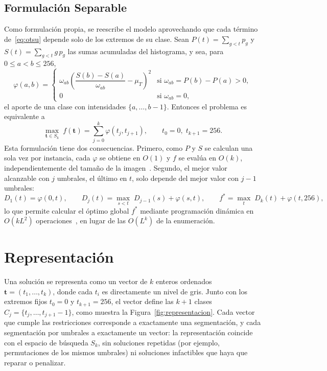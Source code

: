 \documentclass[letter, 10pt]{article}
\begin{document}
\subsection{Formulación Separable}
\label{sec:separable}
Como formulación propia, se reescribe el modelo aprovechando que cada término de~\eqref{eq:otsu} depende solo de los extremos de su clase. Sean $P(t) = \sum_{g < t} p_g$ y $S(t) = \sum_{g < t} g\, p_g$ las sumas acumuladas del histograma, y sea, para $0 \leq a < b \leq 256$,
\begin{equation}
    \varphi(a, b) =
    \begin{cases}
        \omega_{ab} \left( \dfrac{S(b) - S(a)}{\omega_{ab}} - \mu_T \right)^2 & \text{si } \omega_{ab} = P(b) - P(a) > 0, \\[2mm]
        0 & \text{si } \omega_{ab} = 0,
    \end{cases}
\end{equation}
el aporte de una clase con intensidades $\{a, \dots, b-1\}$. Entonces el problema es equivalente a
\begin{equation}
    \max_{\mathbf{t} \in S_k} \; f(\mathbf{t}) = \sum_{j=0}^{k} \varphi(t_j, t_{j+1}), \qquad t_0 = 0, \; t_{k+1} = 256.
    \label{eq:separable}
\end{equation}
Esta formulación tiene dos consecuencias. Primero, como $P$ y $S$ se calculan una sola vez por instancia, cada $\varphi$ se obtiene en $O(1)$ y $f$ se evalúa en $O(k)$, independientemente del tamaño de la imagen~\cite{Liao2001Fast}. Segundo, el mejor valor alcanzable con $j$ umbrales, el último en $t$, solo depende del mejor valor con $j - 1$ umbrales:
\begin{equation}
    D_1(t) = \varphi(0, t), \qquad
    D_j(t) = \max_{s < t} \; D_{j-1}(s) + \varphi(s, t), \qquad
    f^* = \max_{t} \; D_k(t) + \varphi(t, 256),
\end{equation}
lo que permite calcular el óptimo global $f^*$ mediante programación dinámica en $O(k L^2)$ operaciones~\cite{Fisher1958Grouping, Luessi2009Framework}, en lugar de las $O(L^k)$ de la enumeración.

\section{Representación}
\label{sec:representacion}
Una solución se representa como un vector de $k$ enteros ordenados $\mathbf{t} = (t_1, \dots, t_k)$, donde cada $t_i$ es directamente un nivel de gris. Junto con los extremos fijos $t_0 = 0$ y $t_{k+1} = 256$, el vector define las $k+1$ clases $C_j = \{t_j, \dots, t_{j+1}-1\}$, como muestra la Figura~\ref{fig:representacion}. Cada vector que cumple las restricciones corresponde a exactamente una segmentación, y cada segmentación por umbrales a exactamente un vector: la representación coincide con el espacio de búsqueda $S_k$, sin soluciones repetidas (por ejemplo, permutaciones de los mismos umbrales) ni soluciones infactibles que haya que reparar o penalizar.
\end{document}
